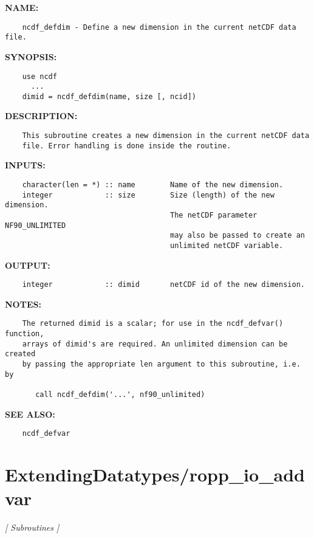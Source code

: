 \label{ch:robo56}
\label{ch:Dimensions_ncdf_defdim}
\textbf{NAME:}\hspace{0.08in}\begin{Verbatim}
    ncdf_defdim - Define a new dimension in the current netCDF data file.
\end{Verbatim}
\textbf{SYNOPSIS:}\hspace{0.08in}\begin{Verbatim}
    use ncdf
      ...
    dimid = ncdf_defdim(name, size [, ncid])
\end{Verbatim}
\textbf{DESCRIPTION:}\hspace{0.08in}\begin{Verbatim}
    This subroutine creates a new dimension in the current netCDF data
    file. Error handling is done inside the routine.
\end{Verbatim}
\textbf{INPUTS:}\hspace{0.08in}\begin{Verbatim}
    character(len = *) :: name        Name of the new dimension.
    integer            :: size        Size (length) of the new dimension.
                                      The netCDF parameter NF90_UNLIMITED
                                      may also be passed to create an
                                      unlimited netCDF variable.
\end{Verbatim}
\textbf{OUTPUT:}\hspace{0.08in}\begin{Verbatim}
    integer            :: dimid       netCDF id of the new dimension.
\end{Verbatim}
\textbf{NOTES:}\hspace{0.08in}\begin{Verbatim}
    The returned dimid is a scalar; for use in the ncdf_defvar() function,
    arrays of dimid's are required. An unlimited dimension can be created
    by passing the appropriate len argument to this subroutine, i.e. by

       call ncdf_defdim('...', nf90_unlimited)
\end{Verbatim}
\textbf{SEE ALSO:}\hspace{0.08in}\begin{Verbatim}
    ncdf_defvar
\end{Verbatim}
\section{ExtendingDatatypes/ropp\_io\_addvar}
\textsl{[ Subroutines ]}

